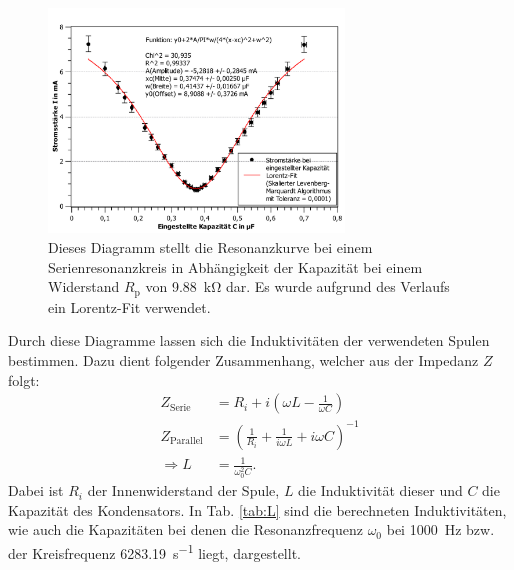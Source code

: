 	\begin{figure}[ht]
		\centering
		\includegraphics[width=0.7\textwidth]{auswertung/Parallel-10kohm(algo).pdf}
		\caption{Dieses Diagramm stellt die Resonanzkurve bei einem Serienresonanzkreis in Abhängigkeit der Kapazität bei einem Widerstand $R_\text{p}$ von \SI{9,88}{\kilo\ohm} dar. Es wurde aufgrund des Verlaufs ein Lorentz-Fit verwendet.}
		\label{fig:parallel10k}	
	\end{figure}	
	Durch diese Diagramme lassen sich die Induktivitäten der verwendeten Spulen bestimmen.
	Dazu dient folgender Zusammenhang, welcher aus der Impedanz $Z$ folgt:
	\begin{align}
		Z_\text{Serie} &= R_i + i\left(\omega L - \frac{1}{\omega C} \right) \\
		Z_\text{Parallel} &= \left( \frac{1}{R_i} + \frac{1}{i\omega L} + i\omega C\right)^{-1} \\
		\Rightarrow L &= \frac{1}{\omega_0^2 C}.
	\end{align}
	Dabei ist $R_i$ der Innenwiderstand der Spule, $L$ die Induktivität dieser und $C$ die Kapazität des Kondensators.	
	In Tab. \ref{tab:L} sind die berechneten Induktivitäten, wie auch die Kapazitäten bei denen die Resonanzfrequenz $\omega_0$ bei \SI{1000}{\hertz} bzw. der Kreisfrequenz \SI{6283,19}{\s^{-1}} liegt, dargestellt.	

